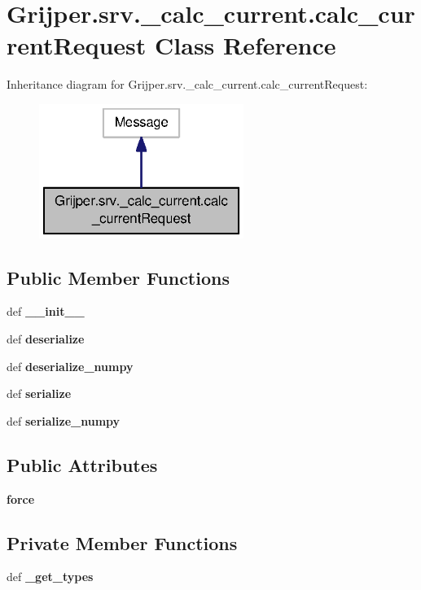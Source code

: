 \section{Grijper.\-srv.\-\_\-calc\-\_\-current.\-calc\-\_\-current\-Request Class Reference}
\label{classGrijper_1_1srv_1_1__calc__current_1_1calc__currentRequest}


Inheritance diagram for Grijper.\-srv.\-\_\-calc\-\_\-current.\-calc\-\_\-current\-Request\-:\nopagebreak
\begin{figure}[H]
\begin{center}
\leavevmode
\includegraphics[width=188pt]{classGrijper_1_1srv_1_1__calc__current_1_1calc__currentRequest__inherit__graph}
\end{center}
\end{figure}
\subsection*{Public Member Functions}
\begin{DoxyCompactItemize}
\item 
def {\bf \-\_\-\-\_\-init\-\_\-\-\_\-}
\item 
def {\bf deserialize}
\item 
def {\bf deserialize\-\_\-numpy}
\item 
def {\bf serialize}
\item 
def {\bf serialize\-\_\-numpy}
\end{DoxyCompactItemize}
\subsection*{Public Attributes}
\begin{DoxyCompactItemize}
\item 
{\bf force}
\end{DoxyCompactItemize}
\subsection*{Private Member Functions}
\begin{DoxyCompactItemize}
\item 
def {\bf \-\_\-get\-\_\-types}
\end{DoxyCompactItemize}
